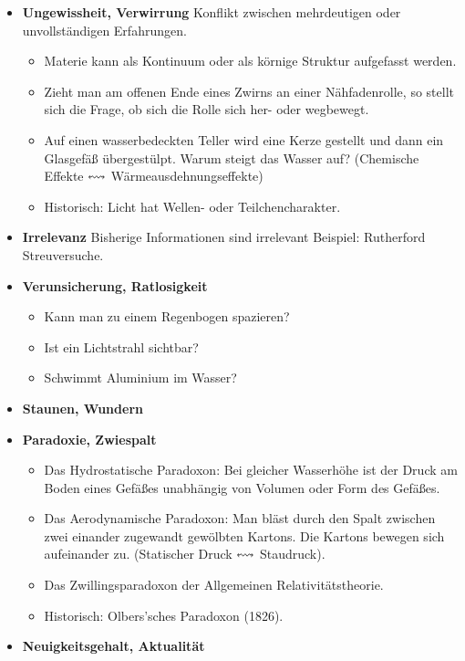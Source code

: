 \begin{itemize}
	\item {\bf Ungewissheit, Verwirrung}
	Konflikt zwischen mehrdeutigen oder unvollst\"{a}ndigen Erfahrungen.
	
	\begin{itemize}
		\item
		Materie kann als Kontinuum oder als k\"{o}rnige Struktur aufgefasst
		werden.
		\item
		Zieht man am offenen Ende eines Zwirns an einer N\"{a}hfadenrolle,
		so stellt sich die Frage, ob sich die Rolle sich her- oder wegbewegt.
		\item
		Auf einen wasserbedeckten Teller wird eine Kerze gestellt und dann
		ein Glasgef\"{a}{\ss} \"{u}bergest\"{u}lpt.
		Warum steigt das Wasser auf? (Chemische Effekte $\leftrightsquigarrow$
		W\"{a}rmeausdehnungseffekte)
		\item
		Historisch: Licht hat Wellen- oder Teilchencharakter.
	\end{itemize}
	
	\item {\bf Irrelevanz}
	Bisherige Informationen sind irrelevant
	Beispiel: Rutherford Streuversuche.
	
	\item {\bf Verunsicherung, Ratlosigkeit}
	\begin{itemize}
		\item
		Kann man zu einem Regenbogen spazieren?
		\item
		Ist ein Lichtstrahl sichtbar?
		\item
		Schwimmt Aluminium im Wasser?
	\end{itemize}
	
	\item {\bf Staunen, Wundern}
	\item {\bf Paradoxie, Zwiespalt}
	
	\begin{itemize}
		\item
		Das Hydrostatische Paradoxon: Bei gleicher Wasserh\"{o}he ist der
		Druck am Boden eines Gef\"{a}{\ss}es unabh\"{a}ngig von Volumen oder Form
		des Gef\"{a}{\ss}es.
		\item
		Das Aerodynamische Paradoxon: Man bl\"{a}st durch den Spalt zwischen
		zwei einander zugewandt gew\"{o}lbten Kartons.
		Die Kartons bewegen sich aufeinander zu.
		(Statischer Druck $\leftrightsquigarrow$ Staudruck).
		
		\item
		Das Zwillingsparadoxon der Allgemeinen Relativit\"{a}tstheorie.
		
		\item
		Historisch: Olbers'sches Paradoxon (1826).
	\end{itemize}
	
	\item {\bf Neuigkeitsgehalt, Aktualit\"{a}t}
\end{itemize}


